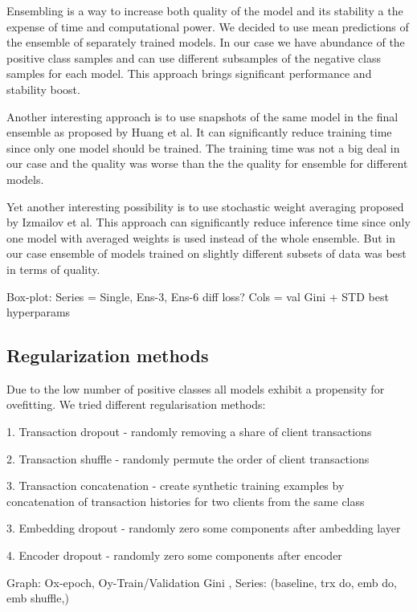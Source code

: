 \documentclass{sigkddExp}
\begin{document}
Ensembling is a way to increase both quality of the model and its stability a the expense of time and computational power. We decided to use mean predictions of the ensemble of separately trained models. In our case we have abundance of the positive class samples and can use different subsamples of the negative class samples for each model. This approach brings significant performance and stability boost.

Another interesting approach is to use snapshots of the same model in the final ensemble as proposed by Huang et al.\cite{DBLP:journals/corr/HuangLPLHW17} It can significantly reduce training time since only one model should be trained. The training time was not a big deal in our case and the quality was worse than the the quality for ensemble for different models.

Yet another interesting possibility is to use stochastic weight averaging proposed by Izmailov et al.\cite{DBLP:journals/corr/LoshchilovH16a} This approach can significantly reduce inference time since only one model with averaged weights is used instead of the whole ensemble. But in our case ensemble of models trained on slightly different subsets of data was best in terms of quality.

Box-plot: Series = {Single, Ens-3, Ens-6  diff loss? } Cols = {val Gini + STD}
best hyperparams


\subsection{Regularization methods}

Due to the low number of positive classes all models exhibit a propensity for ovefitting. We tried different regularisation methods:

1. Transaction dropout - randomly removing a share of client transactions

2. Transaction shuffle - randomly permute the order of client transactions

3. Transaction concatenation - create synthetic training examples by concatenation of 
transaction histories for two clients from the same class

3. Embedding dropout - randomly zero some components after ambedding layer

4. Encoder dropout - randomly zero some components after encoder




Graph: Ox-epoch, Oy-Train/Validation Gini , Series: (baseline, trx do, emb do, emb shuffle,)
\end{document}
